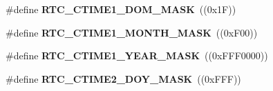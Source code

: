 \begin{DoxyCompactItemize}
\item 
\hypertarget{group___r_t_c__17_x_x__40_x_x_gaa8d85ab9bd2feee7a013b3b422bb740d}{\#define {\bfseries R\+T\+C\+\_\+\+C\+T\+I\+M\+E1\+\_\+\+D\+O\+M\+\_\+\+M\+A\+S\+K}~((0x1\+F))}\label{group___r_t_c__17_x_x__40_x_x_gaa8d85ab9bd2feee7a013b3b422bb740d}

\item 
\hypertarget{group___r_t_c__17_x_x__40_x_x_ga9778cbc861fb273870db239e31cc6140}{\#define {\bfseries R\+T\+C\+\_\+\+C\+T\+I\+M\+E1\+\_\+\+M\+O\+N\+T\+H\+\_\+\+M\+A\+S\+K}~((0x\+F00))}\label{group___r_t_c__17_x_x__40_x_x_ga9778cbc861fb273870db239e31cc6140}

\item 
\hypertarget{group___r_t_c__17_x_x__40_x_x_gae56e613fe29951a7adaa30e1a3cad8b4}{\#define {\bfseries R\+T\+C\+\_\+\+C\+T\+I\+M\+E1\+\_\+\+Y\+E\+A\+R\+\_\+\+M\+A\+S\+K}~((0x\+F\+F\+F0000))}\label{group___r_t_c__17_x_x__40_x_x_gae56e613fe29951a7adaa30e1a3cad8b4}

\item 
\hypertarget{group___r_t_c__17_x_x__40_x_x_gaef423e0d45dc1e2a201d44f8abb1253a}{\#define {\bfseries R\+T\+C\+\_\+\+C\+T\+I\+M\+E2\+\_\+\+D\+O\+Y\+\_\+\+M\+A\+S\+K}~((0x\+F\+F\+F))}\label{group___r_t_c__17_x_x__40_x_x_gaef423e0d45dc1e2a201d44f8abb1253a}


\end{DoxyCompactItemize}
